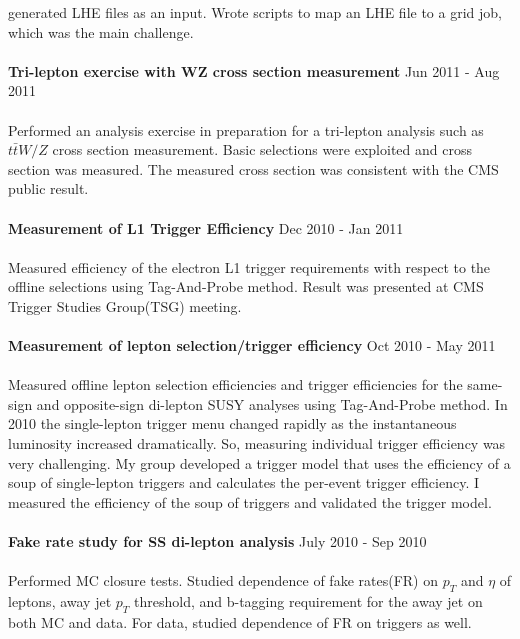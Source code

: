 \documentclass[margin]{res}
\begin{document}
\begin{resume}
     generated LHE files as an input. 
     Wrote scripts to map an LHE file to a grid job, which was the main challenge.  
     \\                
     \\                
\textbf{Tri-lepton exercise with WZ cross section measurement} 
        \hfill Jun 2011 - Aug 2011 
     \\
     \\
     Performed an analysis exercise in preparation for a tri-lepton analysis such as $t\bar{t}W/Z$ 
     cross section measurement. Basic selections were exploited and cross section was measured.
     The measured cross section was consistent with the CMS public result. 
     \\
     \\
\textbf{Measurement of L1 Trigger Efficiency}  
        \hfill Dec 2010 - Jan 2011 
     \\
     \\
     Measured efficiency of the electron L1 trigger requirements
     with respect to the offline selections using Tag-And-Probe method. Result was presented at 
     CMS Trigger Studies Group(TSG) meeting.  
     \\
     \\
\textbf{Measurement of lepton selection/trigger efficiency} 
        \hfill Oct 2010 - May 2011 
     \\
     \\
     Measured offline lepton selection efficiencies and trigger efficiencies for 
     the same-sign and opposite-sign di-lepton SUSY analyses using Tag-And-Probe method. 
     In 2010 the single-lepton trigger menu changed rapidly as the instantaneous 
     luminosity increased dramatically. So, measuring individual trigger efficiency
     was very challenging. My group developed a trigger model that uses the efficiency 
     of a soup of single-lepton triggers and calculates the per-event trigger efficiency. 
     I measured the efficiency of the soup of triggers and validated the trigger model. 
     \\
     \\
\textbf{Fake rate study for SS di-lepton analysis}
      \hfill{July 2010 - Sep 2010} 
     \\
     \\
     Performed MC closure tests. Studied dependence of fake rates(FR) on 
     $p_T$ and $\eta$ of leptons, away jet $p_T$ threshold, and b-tagging requirement for the away jet
     on both MC and data. For data, studied dependence of FR on triggers as well.  

\end{resume}
\end{document}
